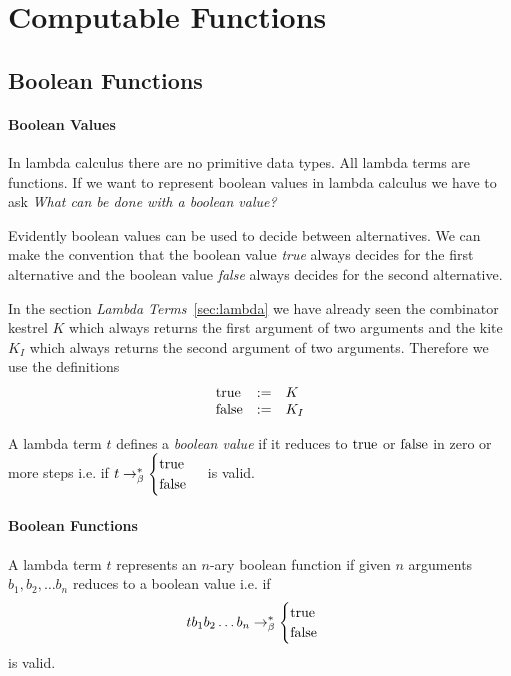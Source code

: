 \section{Computable Functions}
\label{sec:computable}

\subsection {Boolean Functions}

\paragraph{Boolean Values}

In lambda calculus there are no primitive data types. All lambda terms are
functions. If we want to represent boolean values in lambda calculus we have
to ask \emph{What can be done with a boolean value?}

Evidently boolean values can be used to decide between alternatives. We can
make the convention that the boolean value \emph{true} always decides for the
first alternative and the boolean value \emph{false} always decides for the
second alternative.

In the section \emph{Lambda Terms}~\ref{sec:lambda} we have already seen the
combinator kestrel $K$ which always returns the first argument of two
arguments and the kite $K_I$ which always returns the second argument of two
arguments. Therefore we use the definitions
$$
\begin{array}{lll}
  \text{true}  & := & K \\
  \text{false} & := & K_I
\end{array}$$


\begin{definition}
  A lambda term $t$ defines a \emph{boolean value} if it reduces to $\text{true}$ or
  $\text{false}$ in zero or more steps i.e. if
  $t \to^*_\beta
  \begin{cases} \text{true} \\ \text{false}
  \end{cases}$
  is valid.
\end{definition}



\paragraph{Boolean Functions}

\begin{definition}
  A lambda term $t$ represents an $n$-ary boolean function if given $n$
  arguments $b_1, b_2, \ldots b_n$ reduces to a boolean value i.e. if
  $$t b_1 b_2 \ldots b_n \to^*_\beta
  \begin{cases} \text{true} \\ \text{false}
  \end{cases}$$
  is valid.
\end{definition}



